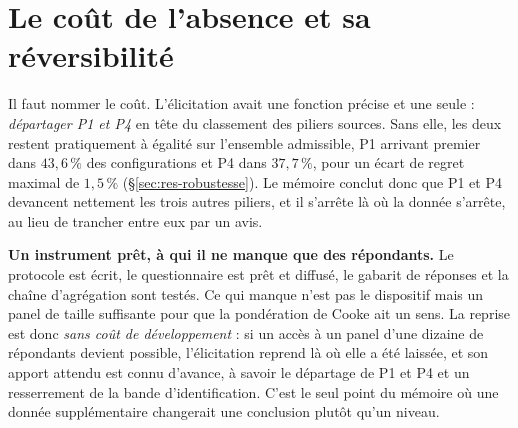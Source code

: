 \section{Le coût de l'absence et sa réversibilité}

Il faut nommer le coût. L'élicitation avait une fonction précise et une seule :
\emph{départager P1 et P4} en tête du classement des piliers sources. Sans elle, les deux
restent pratiquement à égalité sur l'ensemble admissible, P1 arrivant premier dans
$43{,}6\,\%$ des configurations et P4 dans $37{,}7\,\%$, pour un écart de regret maximal de
$1{,}5\,\%$ (\S\ref{sec:res-robustesse}). Le mémoire conclut donc que P1 et P4 devancent nettement les
trois autres piliers, et il s'arrête là où la donnée s'arrête, au lieu de trancher entre eux par
un avis.

\begin{cle}
\textbf{Un instrument prêt, à qui il ne manque que des répondants.} Le protocole est écrit, le
questionnaire est prêt et diffusé, le gabarit de réponses et la chaîne d'agrégation sont testés.
Ce qui manque n'est pas le dispositif mais un panel de taille suffisante pour que la pondération
de Cooke ait un sens. La reprise est donc \emph{sans coût de développement} : si un accès à un panel
d'une dizaine de répondants devient possible, l'élicitation reprend là où elle a été laissée,
et son apport attendu est connu d'avance, à savoir le départage de P1 et P4 et un resserrement
de la bande d'identification. C'est le seul point du mémoire où une donnée supplémentaire
changerait une conclusion plutôt qu'un niveau.
\end{cle}
